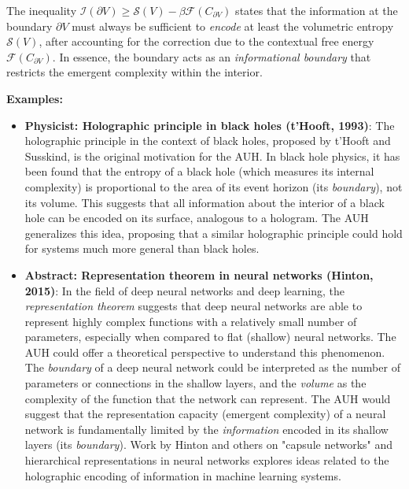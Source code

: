\documentclass{article}
\begin{document}
The inequality $\mathcal{I}(\partial V) \geq \mathcal{S}(V) - \beta \mathcal{F}(C_{\partial V})$ states that the information at the boundary $\partial V$ must always be sufficient to \textit{encode} at least the volumetric entropy $\mathcal{S}(V)$, after accounting for the correction due to the contextual free energy $\mathcal{F}(C_{\partial V})$. In essence, the boundary acts as an \textit{informational boundary} that restricts the emergent complexity within the interior.

\textbf{Examples:}
\begin{itemize}
\item \textbf{Physicist: Holographic principle in black holes (t'Hooft, 1993)}: The holographic principle in the context of black holes, proposed by t'Hooft and Susskind, is the original motivation for the AUH. In black hole physics, it has been found that the entropy of a black hole (which measures its internal complexity) is proportional to the area of its event horizon (its \textit{boundary}), not its volume. This suggests that all information about the interior of a black hole can be encoded on its surface, analogous to a hologram. The AUH generalizes this idea, proposing that a similar holographic principle could hold for systems much more general than black holes.

\item \textbf{Abstract: Representation theorem in neural networks (Hinton, 2015)}: In the field of deep neural networks and deep learning, the \textit{representation theorem} suggests that deep neural networks are able to represent highly complex functions with a relatively small number of parameters, especially when compared to flat (shallow) neural networks. The AUH could offer a theoretical perspective to understand this phenomenon. The \textit{boundary} of a deep neural network could be interpreted as the number of parameters or connections in the shallow layers, and the \textit{volume} as the complexity of the function that the network can represent. The AUH would suggest that the representation capacity (emergent complexity) of a neural network is fundamentally limited by the \textit{information} encoded in its shallow layers (its \textit{boundary}). Work by Hinton and others on "capsule networks" and hierarchical representations in neural networks explores ideas related to the holographic encoding of information in machine learning systems.
\end{itemize}
\end{document}
